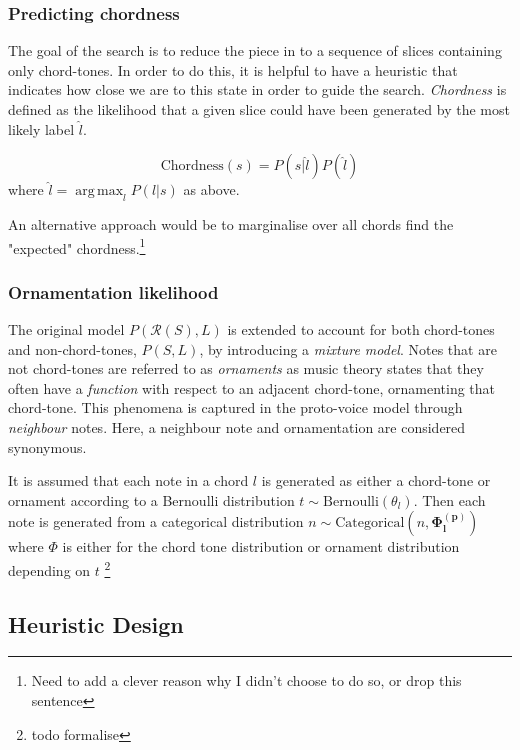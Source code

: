 \documentclass[12pt,a4paper,twoside,openany]{report} \usepackage[pdfborder={0 0 0}]{hyperref}    %
\DeclareMathOperator*{\argmax}{arg\,max} \DeclareMathOperator*{\argmin}{arg\,min}
\theoremstyle{definition} \newtheorem{definition}{Definition}[section]
\begin{document}
  \subsubsection{Predicting chordness} 
  The goal of the search is to reduce the piece in to a sequence of slices
  containing only chord-tones. In order to do this, it is helpful to have a heuristic that indicates how close we are to
  this state in order to guide the search. \textit{Chordness} is defined as the likelihood that a given slice could have
  been generated by the most likely label $\hat{l}$. 

  \begin{equation} \text{Chordness}(s) = P(s | \hat{l}) P(\hat{l}) \label{eq:chordness} \end{equation} where $\hat{l}
  = \argmax_l P(l | s)$ as above.

  An alternative approach would be to marginalise over all chords find the "expected" chordness.\footnote{Need to add
  a clever reason why I didn't choose to do so, or drop this sentence} 

  \subsubsection{Ornamentation likelihood} The original model $P(\mathcal{R}(S),L)$ is extended to account for both
  chord-tones and non-chord-tones, $P(S,L)$, by introducing a \textit{mixture model}. Notes that are not chord-tones are
  referred to as \textit{ornaments} as music theory states that they often have a \textit{function} with respect to an
  adjacent chord-tone, ornamenting that chord-tone. This phenomena is captured in the proto-voice model through
  \textit{neighbour} notes. Here, a neighbour note and ornamentation are considered synonymous. 

  It is assumed that each note in a chord $l$ is generated as either a chord-tone or ornament according to a Bernoulli
  distribution $t \sim \text{Bernoulli}(\theta_l)$. Then each note is generated from a categorical distribution $n \sim
  \text{Categorical}(n,\bm{\Phi_l^{(p)}})$ where $\Phi$ is either for the chord tone distribution or ornament
  distribution depending on $t$ \footnote{todo formalise}

  \subsection{Heuristic Design}
  \label{sub:heuristicDesign}
\end{document}
